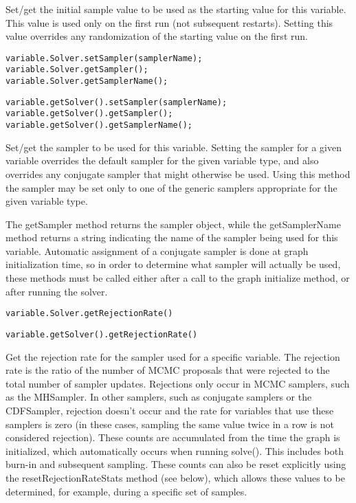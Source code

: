 Set/get the initial sample value to be used as the starting value for this variable.  This value is used only on the first run (not subsequent restarts).  Setting this value overrides any randomization of the starting value on the first run.


\ifmatlab
\begin{lstlisting}
variable.Solver.setSampler(samplerName);
variable.Solver.getSampler();
variable.Solver.getSamplerName();
\end{lstlisting}
\fi

\ifjava
\begin{lstlisting}
variable.getSolver().setSampler(samplerName);
variable.getSolver().getSampler();
variable.getSolver().getSamplerName();
\end{lstlisting}
\fi

Set/get the sampler to be used for this variable.  Setting the sampler for a given variable overrides the default sampler for the given variable type, and also overrides any conjugate sampler that might otherwise be used.  Using this method the sampler may be set only to one of the generic samplers appropriate for the given variable type.

The getSampler method returns the sampler object, while the getSamplerName method returns a string indicating the name of the sampler being used for this variable.  Automatic assignment of a conjugate sampler is done at graph initialization time, so in order to determine what sampler will actually be used, these methods must be called either after a call to the graph initialize method, or after running the solver.

\ifmatlab
\begin{lstlisting}
variable.Solver.getRejectionRate()
\end{lstlisting}
\fi

\ifjava
\begin{lstlisting}
variable.getSolver().getRejectionRate()
\end{lstlisting}
\fi

Get the rejection rate for the sampler used for a specific variable.  The rejection rate is the ratio of the number of MCMC proposals that were rejected to the total number of sampler updates.  Rejections only occur in MCMC samplers, such as the MHSampler.  In other samplers, such as conjugate samplers or the CDFSampler, rejection doesn't occur and the rate for variables that use these samplers is zero (in these cases, sampling the same value twice in a row is not considered rejection).  These counts are accumulated from the time the graph is initialized, which automatically occurs when running solve().  This includes both  burn-in and subsequent sampling.  These counts can also be reset explicitly using the resetRejectionRateStats method (see below), which allows these values to be determined, for example, during a specific set of samples.

